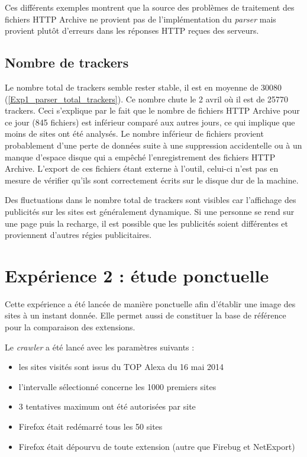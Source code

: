 Ces différents exemples montrent que la source des problèmes de traitement des fichiers HTTP Archive ne provient pas de l'implémentation du \textit{parser} mais provient plutôt d'erreurs dans les réponses HTTP reçues des serveurs.

\subsection{Nombre de trackers}
Le nombre total de trackers semble rester stable, il est en moyenne de 30080 (\autoref{Exp1_parser_total_trackers}). Ce nombre chute le 2 avril où il est de 25770 trackers. Ceci s'explique par le fait que le nombre de fichiers HTTP Archive pour ce jour (845 fichiers) est inférieur comparé aux autres jours, ce qui implique que moins de sites ont été analysés. Le nombre inférieur de fichiers provient probablement d'une perte de données suite à une suppression accidentelle ou à un manque d'espace disque qui a empêché l'enregistrement des fichiers HTTP Archive. L'export de ces fichiers étant externe à l'outil, celui-ci n'est pas en mesure de vérifier qu'ils sont correctement écrits sur le disque dur de la machine.

Des fluctuations dans le nombre total de trackers sont visibles car l'affichage des publicités sur les sites est généralement dynamique. Si une personne se rend sur une page puis la recharge, il est possible que les publicités soient différentes et proviennent d'autres régies publicitaires.

\newpage
\section{Expérience 2 : étude ponctuelle}
\label{experience_ponctuelle}
Cette expérience a été lancée de manière ponctuelle afin d'établir une image des sites à un instant donnée. Elle permet aussi de constituer la base de référence pour la comparaison des extensions.
\newline

Le \textit{crawler} a été lancé avec les paramètres suivants :
\begin{itemize}
	\item les sites visités sont issus du TOP Alexa du 16 mai 2014
	\item l'intervalle sélectionné concerne les 1000 premiers sites
	\item 3 tentatives maximum ont été autorisées par site
	\item Firefox était redémarré tous les 50 sites
	\item Firefox était dépourvu de toute extension (autre que Firebug et NetExport)
\end{itemize}

